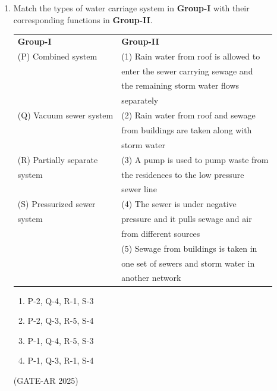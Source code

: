 \documentclass[a4paper,10pt]{article}
\begin{document}
\begin{enumerate}
    \item Match the types of water carriage system in \textbf{Group-I} with their corresponding functions in \textbf{Group-II}. \\
    \begin{tabular}{ l l }
    \textbf{Group-I} & \textbf{Group-II} \\
    (P) Combined system & (1) Rain water from roof is allowed to \\
    & enter the sewer carrying sewage and \\
    & the remaining storm water flows \\
    & separately \\
    (Q) Vacuum sewer system & (2) Rain water from roof and sewage \\
    & from buildings are taken along with \\
    & storm water \\
    (R) Partially separate & (3) A pump is used to pump waste from \\
    system & the residences to the low pressure \\
    & sewer line \\
    (S) Pressurized sewer & (4) The sewer is under negative \\
    system & pressure and it pulls sewage and air \\
    & from different sources \\
    & (5) Sewage from buildings is taken in \\
    & one set of sewers and storm water in \\
    & another network \\
    \end{tabular}
    \begin{multicols}{2}
    \begin{enumerate}
        \item P-2, Q-4, R-1, S-3
        \item P-2, Q-3, R-5, S-4
        \item P-1, Q-4, R-5, S-3
        \item P-1, Q-3, R-1, S-4
    \end{enumerate}
    \end{multicols}
    \hfill (GATE-AR 2025)


\end{enumerate}
\end{document}
